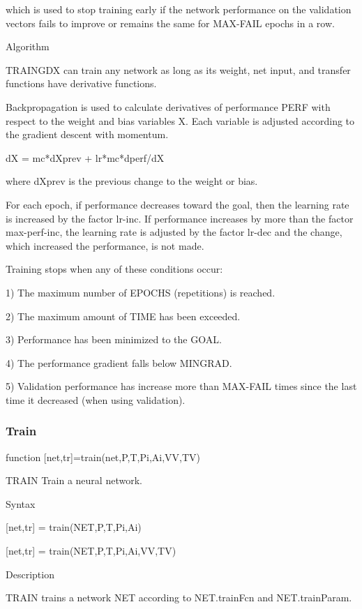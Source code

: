      which is used to stop training early if the network performance
     on the validation vectors fails to improve or remains the same
     for MAX-FAIL epochs in a row.

   Algorithm

     TRAINGDX can train any network as long as its weight, net input,
     and transfer functions have derivative functions.

     Backpropagation is used to calculate derivatives of performance
     PERF with respect to the weight and bias variables X.  Each
     variable is adjusted according to the gradient descent
     with momentum.

       dX = mc*dXprev + lr*mc*dperf/dX

     where dXprev is the previous change to the weight or bias.

     For each epoch, if performance decreases toward the goal, then
     the learning rate is increased by the factor lr-inc.  If
    performance increases by more than the factor max-perf-inc,
     the learning rate is adjusted by the factor lr-dec and the
     change, which increased the performance, is not made.

     Training stops when any of these conditions occur:

     1) The maximum number of EPOCHS (repetitions) is reached.

     2) The maximum amount of TIME has been exceeded.

     3) Performance has been minimized to the GOAL.

     4) The performance gradient falls below MINGRAD.

     5) Validation performance has increase more than MAX-FAIL times
        since the last time it decreased (when using validation).

\subsubsection{Train}
function [net,tr]=train(net,P,T,Pi,Ai,VV,TV)

TRAIN Train a neural network.

   Syntax

     [net,tr] = train(NET,P,T,Pi,Ai)

     [net,tr] = train(NET,P,T,Pi,Ai,VV,TV)

   Description

     TRAIN trains a network NET according to NET.trainFcn and
     NET.trainParam.

